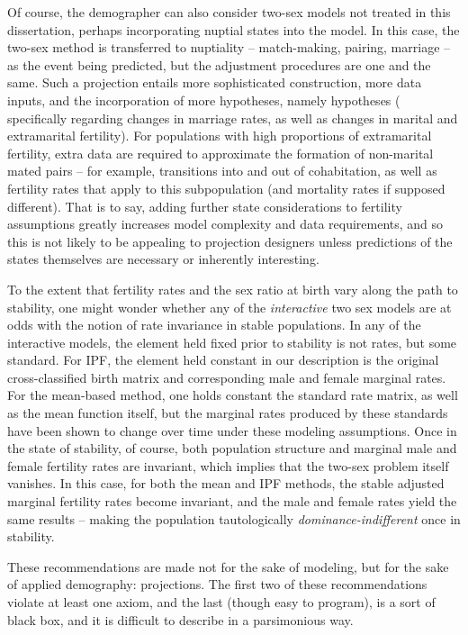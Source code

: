 Of course, the demographer can also consider two-sex models not treated
in this dissertation, perhaps incorporating nuptial states into the model. 
In this case, the two-sex method is transferred to nuptiality --
match-making, pairing, marriage -- as the event being predicted, but the
adjustment procedures are one and the same. Such a projection
entails more sophisticated construction, more data inputs, and the incorporation
of more hypotheses, namely hypotheses ( specifically regarding changes in
marriage rates, as well as changes in marital and extramarital fertility). For
populations with high proportions of extramarital fertility, extra data are required to approximate the formation of
non-marital mated pairs -- for example, transitions into and out of
cohabitation, as well as fertility rates that apply to this subpopulation (and mortality
rates if supposed different). That is to say, adding further state
considerations to fertility assumptions greatly increases model complexity
and data requirements, and so this is not likely to be appealing to projection
designers unless predictions of the states themselves are necessary or
inherently interesting.

To the extent that fertility rates and the sex ratio at
birth vary along the path to stability, one might wonder whether any of the
\textit{interactive} two sex models are at odds with the notion of
rate invariance in stable populations. In any of the
interactive models, the element held fixed prior to stability is not rates, but
some standard. For IPF, the element held constant in our 
description is the original cross-classified birth matrix and corresponding 
male and female marginal rates. For the mean-based method, one holds constant 
the standard rate matrix, as well as the mean function itself, but the marginal 
rates produced by these standards have been shown to change over time
under these modeling assumptions. Once in the state of stability, of
course, both population structure and marginal male and female fertility rates are invariant, which
implies that the two-sex problem itself vanishes. In this case, for both the
mean and IPF methods, the stable adjusted marginal fertility rates become
invariant, and the male and female rates yield the same results -- making the
population tautologically \textit{dominance-indifferent} once in stability.

These recommendations are made not for the sake of modeling, but for the sake of
applied demography: projections. The first two of these recommendations
violate at least one axiom, and the last (though easy to program), is a sort of
black box, and it is difficult to describe in a parsimonious way.
